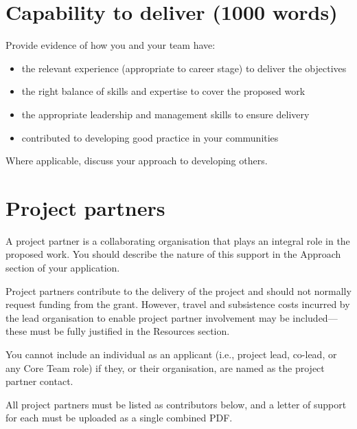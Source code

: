 \documentclass[12pt]{article}
\newenvironment{instruction}{%
    \begin{tcolorbox}[colback=red!5,colframe=red,title=Instruction]%
}{%
    \end{tcolorbox}%
}
\begin{document}
\pagebreak

\section*{Capability to deliver (1000 words)}

\begin{instruction}
Provide evidence of how you and your team have:

    \begin{itemize}
        \item the relevant experience (appropriate to career stage) to deliver the objectives
        \item the right balance of skills and expertise to cover the proposed work
        \item the appropriate leadership and management skills to ensure delivery
        \item contributed to developing good practice in your communities
    \end{itemize}

Where applicable, discuss your approach to developing others.

\end{instruction}

\pagebreak

\section*{Project partners}

\begin{instruction}

A project partner is a collaborating organisation that plays an integral role in the proposed work. You should describe the nature of this support in the Approach section of your application.

Project partners contribute to the delivery of the project and should not normally request funding from the grant. However, travel and subsistence costs incurred by the lead organisation to enable project partner involvement may be included—these must be fully justified in the Resources section.

You cannot include an individual as an applicant (i.e., project lead, co-lead, or any Core Team role) if they, or their organisation, are named as the project partner contact.

All project partners must be listed as contributors below, and a letter of support for each must be uploaded as a single combined PDF.

\end{instruction}
\end{document}

